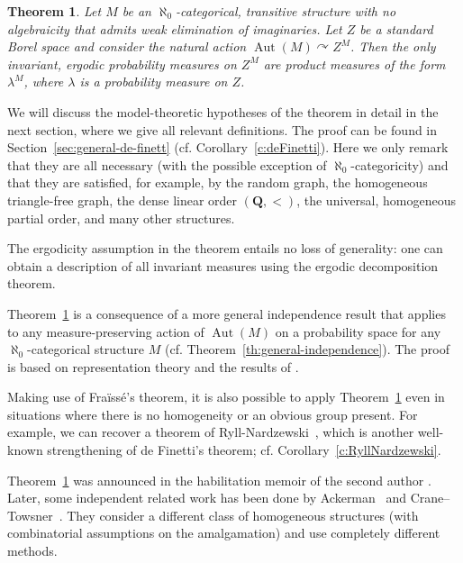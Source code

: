 \documentclass[11pt]{article}
\newcommand{\cf}{cf.\xspace}
\let\actson\curvearrowright
\theoremstyle{plain}
\newtheorem{theorem}{Theorem}[section]
\theoremstyle{definition}
\newcommand{\Q}{{\mathbf Q}}
\DeclareMathOperator{\Aut}{Aut}
\begin{document}
\begin{theorem}
\label{th:intro:deFinetti}
Let $M$ be an $\aleph_0$-categorical, transitive structure with no algebraicity that admits weak elimination of imaginaries. Let $Z$ be a standard Borel space and consider the natural action $\Aut(M) \actson Z^M$. Then the only invariant, ergodic probability measures on $Z^M$ are product measures of the form $\lambda^M$, where $\lambda$ is a probability measure on $Z$.
\end{theorem}
We will discuss the model-theoretic hypotheses of the theorem in detail in the next section, where we give all relevant definitions. The proof can be found in Section~\ref{sec:general-de-finett} (\cf Corollary~\ref{c:deFinetti}). Here we only remark that they are all necessary (with the possible exception of $\aleph_0$-categoricity) and that they are satisfied, for example, by the random graph, the homogeneous triangle-free graph, the dense linear order $(\Q, <)$, the universal, homogeneous partial order, and many other structures.

The ergodicity assumption in the theorem entails no loss of generality: one can obtain a description of all invariant measures using the ergodic decomposition theorem.

Theorem~\ref{th:intro:deFinetti} is a consequence of a more general independence result that applies to any measure-preserving action of $\Aut(M)$ on a probability space for any $\aleph_0$-categorical structure $M$ (\cf Theorem~\ref{th:general-independence}). The proof is based on representation theory and the results of \cite{Tsankov2012}.

Making use of Fraïssé's theorem, it is also possible to apply Theorem~\ref{th:intro:deFinetti} even in situations where there is no homogeneity or an obvious group present. For example, we can recover a theorem of Ryll-Nardzewski~\cite{RyllNardzewski1957}, which is another well-known strengthening of de Finetti's theorem; \cf Corollary~\ref{c:RyllNardzewski}.

Theorem~\ref{th:intro:deFinetti} was announced in the habilitation memoir of the second author \cite{Tsankov2014}. Later, some independent related work has been done by Ackerman~\cite{Ackerman2015p} and Crane--Towsner~\cite{Crane2018}. They consider a different class of homogeneous structures (with combinatorial assumptions on the amalgamation) and use completely different methods.\enlargethispage{.5\baselineskip}%
\end{document}
